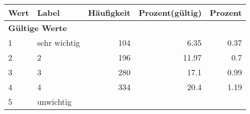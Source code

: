      \begin{longtable}{lXrrr}
     \toprule
     \textbf{Wert} & \textbf{Label} & \textbf{Häufigkeit} & \textbf{Prozent(gültig)} & \textbf{Prozent} \\
     \endhead
     \midrule
     \multicolumn{5}{l}{\textbf{Gültige Werte}}\\

     1 &
     \multicolumn{1}{X}{ sehr wichtig   } &


       \num{104} &
       \num[round-mode=places,round-precision=2]{6,35} &
         \num[round-mode=places,round-precision=2]{0,37} \\

     2 &
     \multicolumn{1}{X}{ 2   } &


       \num{196} &
       \num[round-mode=places,round-precision=2]{11,97} &
         \num[round-mode=places,round-precision=2]{0,7} \\

     3 &
     \multicolumn{1}{X}{ 3   } &


       \num{280} &
       \num[round-mode=places,round-precision=2]{17,1} &
         \num[round-mode=places,round-precision=2]{0,99} \\

     4 &
     \multicolumn{1}{X}{ 4   } &


       \num{334} &
       \num[round-mode=places,round-precision=2]{20,4} &
         \num[round-mode=places,round-precision=2]{1,19} \\

     5 &
     \multicolumn{1}{X}{ unwichtig   } &



\end{longtable}
